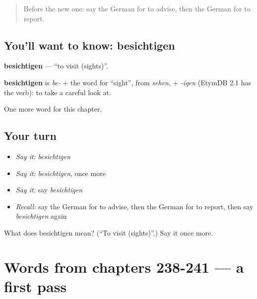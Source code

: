 \label{lesson:GE-C246-besichtigen}



\begin{quote}
Before the new one: say the German for to advise, then the German for to report.
\end{quote}

\subsection*{You'll want to know: besichtigen}
\textbf{besichtigen} — \textquotedblleft{}to visit (sights)\textquotedblright{}.

\begin{cousinweb}
\textbf{besichtigen} is \emph{be-} + the word for \textquotedblleft{}sight\textquotedblright{}, from \emph{sehen}, + \emph{-igen} (EtymDB 2.1 has the verb): to take a careful look at.
\end{cousinweb}

\begin{grammarlens}[title={What you've built}]
One more word for this chapter.
\end{grammarlens}

\subsection*{Your turn}
\begin{itemize}
\raggedright
  \item \emph{Say it:} \emph{besichtigen}
  \item \emph{Say it:} \emph{besichtigen}, once more
  \item \emph{Say it:} say \emph{besichtigen}
  \item \emph{Recall:} say the German for to advise, then the German for to report, then say \emph{besichtigen} again
\end{itemize}

\begin{tcolorbox}[breakable,colback=teal!4,colframe=teal!35!black,title={Before you move on}]
What does besichtigen mean? (\textquotedblleft{}To visit (sights)\textquotedblright{}.) Say it once more.
\end{tcolorbox}
\section[(dialogue)]{Words from chapters 238-241 — a first pass}

\label{lesson:GE-R246-first-pass-words-from-chapters-238-241}



